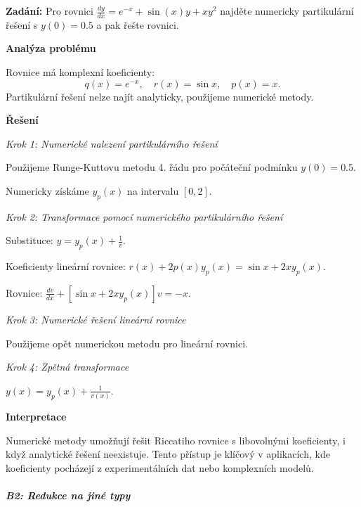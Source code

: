 \begin{example}
\label{ex:b1-slozity-numericke}

\noindent\textbf{Zadání:} Pro rovnici $\frac{dy}{dx} = e^{-x} + \sin(x)y + xy^2$ najděte
numericky partikulární řešení s $y(0) = 0.5$ a pak řešte rovnici.

\vspace{1.5\baselineskip}

\noindent\textbf{Analýza problému}

\noindent Rovnice má komplexní koeficienty:
\[
q(x) = e^{-x}, \quad r(x) = \sin x, \quad p(x) = x.
\]
Partikulární řešení nelze najít analyticky, použijeme numerické metody.

\vspace{1.5\baselineskip}

\noindent\textbf{Řešení}

\noindent\textit{Krok 1: Numerické nalezení partikulárního řešení}

Použijeme Runge-Kuttovu metodu 4. řádu pro počáteční podmínku $y(0) = 0.5$.

Numericky získáme $y_p(x)$ na intervalu $[0, 2]$.

\noindent\textit{Krok 2: Transformace pomocí numerického partikulárního řešení}

Substituce: $y = y_p(x) + \frac{1}{v}$.

Koeficienty lineární rovnice: $r(x) + 2p(x)y_p(x) = \sin x + 2x y_p(x)$.

Rovnice: $\frac{dv}{dx} + [\sin x + 2x y_p(x)]v = -x$.

\noindent\textit{Krok 3: Numerické řešení lineární rovnice}

Použijeme opět numerickou metodu pro lineární rovnici.

\noindent\textit{Krok 4: Zpětná transformace}

$y(x) = y_p(x) + \frac{1}{v(x)}$.

\vspace{1.5\baselineskip}

\noindent\textbf{Interpretace}

Numerické metody umožňují řešit Riccatiho rovnice s libovolnými koeficienty, 
i když analytické řešení neexistuje. Tento přístup je klíčový v aplikacích, 
kde koeficienty pocházejí z experimentálních dat nebo komplexních modelů.

\end{example}

\subparagraph*{B2: Redukce na jiné typy}
\label{subpar:b2-redukce-jine-typy}

